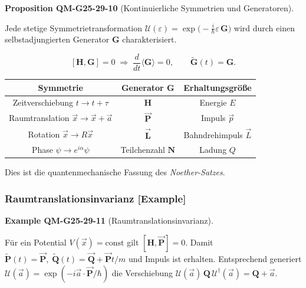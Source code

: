 \documentclass[10pt, letterpaper]{article}
\newcommand{\CustomHeading}[3]{%
  \par\medskip\noindent%
  \textbf{#1 #2} \textnormal{(#3)}.\enskip%
}
\newenvironment{PROP}[2]{\begin{unitbox}\CustomHeading{Proposition}{#1}{#2}}{\end{unitbox}}
\newenvironment{EXA}[2]{\begin{unitbox}\CustomHeading{Example}{#1}{#2}}{\end{unitbox}}
\begin{document}
\begin{PROP}{QM-G25-29-10}{Kontinuierliche Symmetrien und Generatoren}
Jede stetige Symmetrietransformation
\(
\mathcal U(\varepsilon)=\exp\!\bigl(-\tfrac{i}{\hbar}\varepsilon\,\mathbf G\bigr)
\)
wird durch einen selbstadjungierten Generator $\mathbf G$ charakterisiert.

\[
[\mathbf H,\mathbf G]=0
\;\Longrightarrow\;
\frac{d}{dt}\langle\mathbf G\rangle=0,
\qquad
\tilde{\mathbf G}(t)=\mathbf G.
\]


\begin{center}
\begin{tabular}{|c|c|c|}
\hline
Symmetrie & Generator $\mathbf G$ & Erhaltungsgröße \\
\hline
Zeitverschiebung $t\!\to\!t+\tau$       & $\mathbf H$                 & Energie $E$ \\
Raumtranslation $\vec x\!\to\!\vec x+\vec a$ & $\vec{\mathbf P}$        & Impuls $\vec p$ \\
Rotation $\vec x\!\to\!R\vec x$         & $\vec{\mathbf L}$           & Bahndrehimpuls $\vec L$ \\
Phase $\psi\!\to\!e^{i\alpha}\psi$      & Teilchenzahl $\mathbf N$    & Ladung $Q$ \\
\hline
\end{tabular}
\end{center}

Dies ist die quantenmechanische Fassung des \emph{Noether-Satzes}.
\end{PROP}


\subsubsection*{Raumtranslationsinvarianz [Example]}

\begin{EXA}{QM-G25-29-11}{Raumtranslationsinvarianz}
Für ein Potential $V(\vec x)=\text{const}$ gilt
\(
[\mathbf H,\vec{\mathbf P}]=0.
\)
Damit
\(
\tilde{\mathbf P}(t)=\vec{\mathbf P},\;
\tilde{\mathbf Q}(t)=\vec{\mathbf Q}+\vec{\mathbf P}t/m
\)
und Impuls ist erhalten.  
Entsprechend generiert
\(
\mathcal U(\vec a)=\exp(-i\vec a\!\cdot\!\vec{\mathbf P}/\hbar)
\)
die Verschiebung
\(
\mathcal U(\vec a)\,\mathbf Q\,\mathcal U^\dagger(\vec a)
        =\mathbf Q+\vec a.
\)
\end{EXA}

\end{document}
